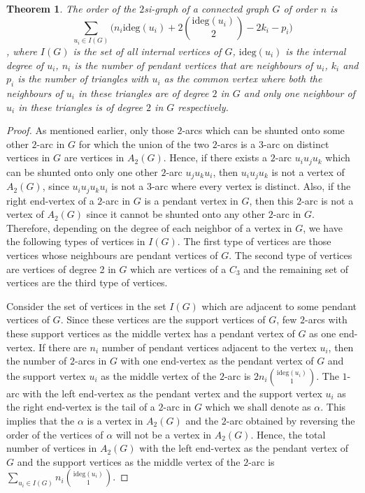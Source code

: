 \documentclass[12pt,a4paper,twoside]{article}
\newcommand{\ideg}[1]{\mathrm{ideg}}
\newtheorem{theorem}{Theorem}[section]
\theoremstyle{casesty}
\theoremstyle{subcasesty}
\theoremstyle{schemesty}
\begin{document}
\begin{theorem} \label{Asnumber2}
	The order of the $2$si-graph of a connected graph $G$ of order $n$ is $$\sum\limits_{u_{i} \in I(G)} \Big (n_{i}\ideg{G}(u_{i})  + 2{\ideg{G}(u_{i}) \choose 2} - 2k_{i} - p_{i} \Big )$$, where $I(G)$ is the set of all internal vertices of $G$, $\ideg{G}(u_{i})$ is the internal degree of $u_{i}$, $n_{i}$ is the number of pendant vertices that are neighbours of $u_{i}$, $k_{i}$ and $p_{i}$ is the number of triangles with $u_{i}$ as the common vertex where both the neighbours of $u_{i}$ in these triangles are of degree $2$ in $G$ and only one neighbour of $u_{i}$ in these triangles is of degree $2$ in $G$ respectively.
\end{theorem}
\begin{proof}
	As mentioned earlier, only those $2$-arcs which can be shunted onto some other $2$-arc in $G$ for which the union of the two $2$-arcs is a $3$-arc on distinct vertices in $G$ are vertices in $A_{2}(G)$. Hence, if there exists a $2$-arc $u_{i}u_{j}u_{k}$ which can be shunted onto only one other $2$-arc $u_{j}u_{k}u_{i}$, then $u_{i}u_{j}u_{k}$ is not a vertex of $A_{2}(G)$, since $u_{i}u_{j}u_{k}u_{i}$ is not a $3$-arc where every vertex is distinct. Also, if the right end-vertex of a $2$-arc in $G$ is a pendant vertex in $G$, then this $2$-arc is not a vertex of $A_{2}(G)$ since it cannot be shunted onto any other $2$-arc in $G$. Therefore, depending on the degree of each neighbor of a vertex in $G$, we have the following types of vertices in $I(G)$. The first type of vertices are those vertices whose neighbours are pendant vertices of $G$. The second type of vertices are vertices of degree 2 in $G$ which are vertices of a $C_{3}$ and the remaining set of vertices are the third type of vertices.
	
	Consider the set of vertices in the set $I(G)$ which are adjacent to some pendant vertices of $G$. Since these vertices are the support vertices of $G$, few $2$-arcs with these support vertices as the middle vertex has a pendant vertex of $G$ as one end-vertex. If there are $n_{i}$ number of pendant vertices adjacent to the vertex $u_{i}$, then the number of $2$-arcs in $G$ with one end-vertex as the pendant vertex of $G$ and the support vertex $u_{i}$ as the middle vertex of the $2$-arc is $2n_{i}{\ideg{G}(u_{i}) \choose 1}$. The $1$-arc with the left end-vertex as the pendant vertex and the support vertex $u_{i}$ as the right end-vertex is the tail of a $2$-arc in $G$ which we shall denote as $\alpha$. This implies that the $\alpha$ is a vertex in $A_{2}(G)$ and the $2$-arc obtained by reversing the order of the vertices of $\alpha$ will not be a vertex in $A_{2}(G)$. Hence, the total number of vertices in $A_{2}(G)$ with the left end-vertex as the pendant vertex of $G$ and the support vertices as the middle vertex of the $2$-arc is $\sum\limits_{u_{i} \in I(G)} n_{i}{\ideg{G}(u_{i}) \choose 1}$.
	

\end{proof}
\end{document}
